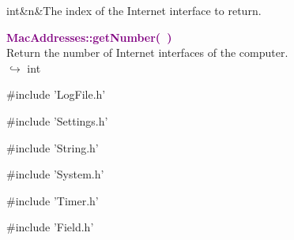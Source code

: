 \begin{tcolorbox}[width=\textwidth,myArgs,tabularx={ll|R},title=Arguments of MacAddresses::getInterface]
int&n&The index of the Internet interface to return.
\end{tcolorbox}


\textcolor{purple}{\textbf{MacAddresses::getNumber(~)}}\label{MacAddresses::getNumber()}\\
Return the number of Internet interfaces of the computer.\\ \hspace*{10mm}$\hookrightarrow$ int



\#include 'LogFile.h'

\#include 'Settings.h'

\#include 'String.h'

\#include 'System.h'

\#include 'Timer.h'

\#include 'Field.h'
